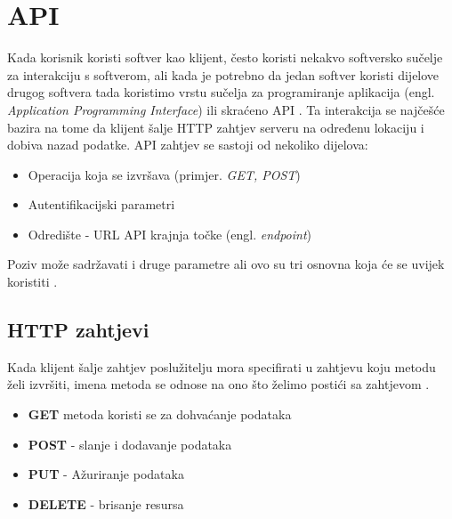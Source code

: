 \documentclass{foi}
\begin{document}
\section{API}
Kada korisnik koristi softver kao klijent, često koristi nekakvo softversko sučelje za interakciju s softverom, ali kada je potrebno da jedan softver koristi dijelove drugog softvera tada koristimo vrstu sučelja za programiranje aplikacija (engl. \textit{Application Programming Interface}) ili skraćeno API \cite{biehl2015api}.
Ta interakcija se najčešće bazira na tome da klijent šalje HTTP zahtjev serveru na određenu lokaciju i dobiva nazad podatke.
API zahtjev se sastoji od nekoliko dijelova:
\begin{itemize}
    \item Operacija koja se izvršava (primjer. \textit{GET, POST})
    \item Autentifikacijski parametri
    \item Odredište - URL API krajnja točke (engl. \textit{endpoint})
\end{itemize}
Poziv može sadržavati i druge parametre ali ovo su tri osnovna koja će se uvijek koristiti \cite{altexsoft}.
\subsection{HTTP zahtjevi}
Kada klijent šalje zahtjev poslužitelju mora specifirati u zahtjevu koju metodu želi izvršiti, imena metoda se odnose na ono što želimo postići sa zahtjevom \cite{Maurya2021}. 
\begin{itemize}
    \item \textbf{GET} metoda koristi se za dohvaćanje podataka
    \item \textbf{POST} - slanje i dodavanje podataka
    \item \textbf{PUT} - Ažuriranje podataka
    \item \textbf{DELETE} - brisanje resursa 
\end{itemize}
\end{document}
